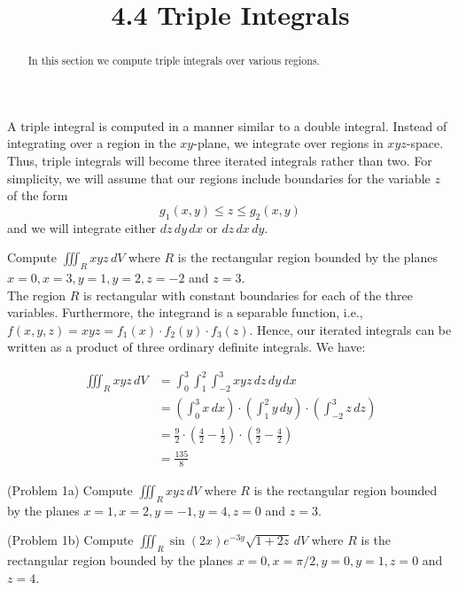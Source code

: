 \documentclass[handout]{ximera}
\title{4.4 Triple Integrals}
\begin{document}
\begin{abstract}
In this section we compute triple integrals over various regions.
\end{abstract}
 
\maketitle

A triple integral is computed in a manner similar to a double integral.  Instead of integrating over a region in the $xy$-plane,
we integrate over regions in $xyz$-space.  Thus, triple integrals will become three iterated integrals rather than two.
For simplicity, we will assume that our regions include boundaries for the variable $z$ of the form 
\[
g_1(x,y) \leq z \leq g_2(x,y)
\]
and we will integrate either $dz\, dy\, dx$ or $dz\, dx\, dy$.


\begin{example}[Example 1]
Compute $\iiint_R xyz \, dV$ where $R$ is the rectangular region bounded by the 
planes $x = 0, x = 3, y = 1, y = 2, z = -2$ and $z = 3$.\\
The region $R$ is rectangular with constant boundaries for each of the three variables.  Furthermore, the integrand
is a separable function, i.e., $f(x,y,z) = xyz = f_1(x) \cdot f_2(y) \cdot f_3(z)$. Hence, our iterated integrals can 
be written as a product of three ordinary definite integrals. We have:

\begin{align*}
\iiint_R xyz \, dV & = \int_0^3\int_1^2 \int_{-2}^3 xyz \,dz\, dy \, dx\\
                 & =\left(\int_0^3 x \, dx \right) \cdot \left(\int_1^2 y\, dy\right) \cdot \left(\int_{-2}^3z \,dz \right)\\
                 & = \frac92 \cdot \left(\frac{4}{2} -\frac12\right) \cdot \left(\frac92 - \frac42\right)\\
                 &=  \frac{135}{8}
\end{align*}      

\end{example}


\begin{problem}(Problem 1a)
Compute $\iiint_R xyz \, dV$ where $R$ is the rectangular region bounded by the 
planes $x = 1, x = 2, y = -1, y = 4, z = 0$ and $z = 3$.\\
\end{problem}

\begin{problem}(Problem 1b)
Compute $\iiint_R \sin(2x)e^{-3y}\sqrt{1+ 2z} \, dV$ where $R$ is the rectangular region bounded by the 
planes $x = 0, x = \pi/2, y = 0, y = 1, z = 0$ and $z = 4$.\\
\end{problem}
\end{document}
